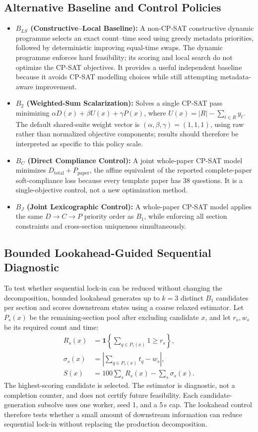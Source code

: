 \documentclass[runningheads]{llncs}
\begin{document}
\subsection{Alternative Baseline and Control Policies}
\begin{itemize}\setlength{\itemsep}{1pt}\setlength{\parskip}{0pt}
    \item \textbf{$B_{LS}$ (Constructive--Local Baseline):} A non-CP-SAT constructive dynamic programme selects an exact count--time seed using greedy metadata priorities, followed by deterministic improving equal-time swaps. The dynamic programme enforces hard feasibility; its scoring and local search do not optimize the CP-SAT objectives. It provides a useful independent baseline because it avoids CP-SAT modelling choices while still attempting metadata-aware improvement.
    \item \textbf{$B_2$ (Weighted-Sum Scalarization):} Solves a single CP-SAT pass minimizing $\alpha D(x) + \beta U(x) + \gamma P(x)$, where $U(x) = |R| - \sum_{t\in R} y_t$. The default shared-suite weight vector is $(\alpha,\beta,\gamma)=(1,1,1)$, using raw rather than normalized objective components; results should therefore be interpreted as specific to this policy scale.
    \item \textbf{$B_C$ (Direct Compliance Control):} A joint whole-paper CP-SAT model minimizes $D_{\mathrm{total}}+P_{\mathrm{paper}}$, the affine equivalent of the reported complete-paper soft-compliance loss because every template paper has 38 questions. It is a single-objective control, not a new optimization method.
    \item \textbf{$B_J$ (Joint Lexicographic Control):} A whole-paper CP-SAT model applies the same $D\!\to\!C\!\to\!P$ priority order as $B_1$, while enforcing all section constraints and cross-section uniqueness simultaneously.
\end{itemize}
\subsection{Bounded Lookahead-Guided Sequential Diagnostic}
To test whether sequential lock-in can be reduced without changing the decomposition, bounded lookahead generates up to $k=3$ distinct $B_1$ candidates per section and scores downstream states using a coarse relaxed estimator. Let $P_s(x)$ be the remaining-section pool after excluding candidate $x$, and let $r_s,w_s$ be its required count and time:
\begin{align}
R_s(x) &= \mathbf{1}\left\{\sum_{q\in P_s(x)}1\ge r_s\right\}, \\
\sigma_s(x) &= \left|\sum_{q\in P_s(x)}t_q-w_s\right|, \\
S(x) &= 100\sum_s R_s(x)-\sum_s \sigma_s(x).
\end{align}
The highest-scoring candidate is selected. The estimator is diagnostic, not a completion counter, and does not certify future feasibility. Each candidate-generation subsolve uses one worker, seed 1, and a 5\,s cap. The lookahead control therefore tests whether a small amount of downstream information can reduce sequential lock-in without replacing the production decomposition.
\end{document}
